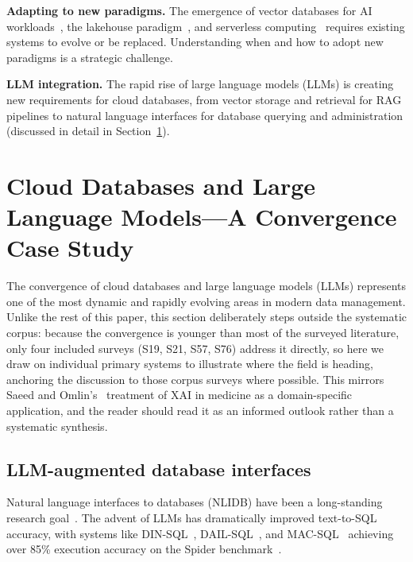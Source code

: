 \documentclass[a4paper,fleqn]{cas-sc}
\begin{document}
\textbf{Adapting to new paradigms.} The emergence of vector databases for AI workloads~\cite{Pan2024VectorDB}, the lakehouse paradigm~\cite{Armbrust2021Lakehouse}, and serverless computing~\cite{Muller2020Serverless} requires existing systems to evolve or be replaced. Understanding when and how to adopt new paradigms is a strategic challenge.

\textbf{LLM integration.} The rapid rise of large language models (LLMs) is creating new requirements for cloud databases, from vector storage and retrieval for RAG pipelines to natural language interfaces for database querying and administration (discussed in detail in Section~\ref{sec:llm}).


\section{Cloud Databases and Large Language Models---A Convergence Case Study}
\label{sec:llm}

The convergence of cloud databases and large language models (LLMs) represents one of the most dynamic and rapidly evolving areas in modern data management. Unlike the rest of this paper, this section deliberately steps outside the systematic corpus: because the convergence is younger than most of the surveyed literature, only four included surveys (S19, S21, S57, S76) address it directly, so here we draw on individual primary systems to illustrate where the field is heading, anchoring the discussion to those corpus surveys where possible. This mirrors Saeed and Omlin's~\cite{Saeed2023XAI} treatment of XAI in medicine as a domain-specific application, and the reader should read it as an informed outlook rather than a systematic synthesis.

\subsection{LLM-augmented database interfaces}
\label{subsec:nl2sql}

Natural language interfaces to databases (NLIDB) have been a long-standing research goal~\cite{Affolter2019NLIDB}. The advent of LLMs has dramatically improved text-to-SQL accuracy, with systems like DIN-SQL~\cite{Pourreza2023DINSQL}, DAIL-SQL~\cite{Gao2023DAILSQL}, and MAC-SQL~\cite{Wang2024MACSQL} achieving over 85\% execution accuracy on the Spider benchmark~\cite{Yu2018Spider}.
\end{document}
